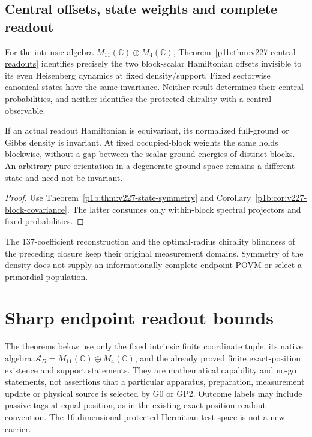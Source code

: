 \documentclass[12pt,a4paper]{article}
\begin{document}
\subsection{Central offsets, state weights and complete readout}
\label{p2c:sec:v227-central-readout}
For the intrinsic algebra $M_{11}(\mathbb C)\oplus M_4(\mathbb C)$,
Theorem~\ref{p1b:thm:v227-central-readouts} identifies precisely the two
block-scalar Hamiltonian offsets invisible to its even Heisenberg dynamics
at fixed density/support. Fixed sectorwise canonical states have the same
invariance. Neither result determines their central probabilities, and
neither identifies the protected chirality with a central observable.

\begin{corollary}
\label{p2c:cor:v227-canonical-covariance}
If an actual readout Hamiltonian is equivariant, its normalized full-ground
or Gibbs density is invariant. At fixed occupied-block weights the same
holds blockwise, without a gap between the scalar ground energies of distinct
blocks. An arbitrary pure orientation in a degenerate ground space remains
a different state and need not be invariant.
\end{corollary}
\begin{proof}
Use Theorem~\ref{p1b:thm:v227-state-symmetry} and
Corollary~\ref{p1b:cor:v227-block-covariance}. The latter consumes only
within-block spectral projectors and fixed probabilities.
\end{proof}
The 137-coefficient reconstruction and the optimal-radius chirality blindness
of the preceding closure keep their original measurement domains. Symmetry
of the density does not supply an informationally complete endpoint POVM
or select a primordial population.




\section{Sharp endpoint readout bounds}
\label{p2c:sec:v355-sharp-readout-resources}
The theorems below use only the fixed intrinsic finite coordinate tuple,
its native algebra $\mathcal A_D=M_{11}(\mathbb C)\oplus M_4(\mathbb C)$,
and the already proved finite exact-position existence and support statements.
They are mathematical capability and no-go statements, not assertions that a
particular apparatus, preparation, measurement update or physical source is
selected by G0 or GP2. Outcome labels may include passive tags at equal
position, as in the existing exact-position readout convention.
The 16-dimensional protected Hermitian test space is not a new carrier.
\end{document}
